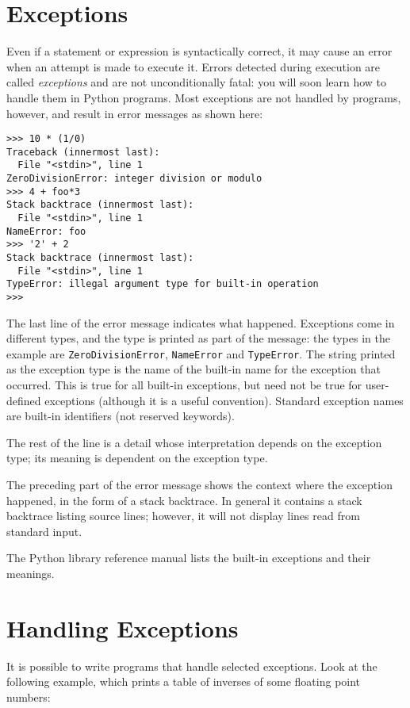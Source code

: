 \section{Exceptions}

Even if a statement or expression is syntactically correct, it may
cause an error when an attempt is made to execute it.
Errors detected during execution are called {\em exceptions} and are
not unconditionally fatal: you will soon learn how to handle them in
Python programs.  Most exceptions are not handled by programs,
however, and result in error messages as shown here:

\bcode\small\begin{verbatim}
>>> 10 * (1/0)
Traceback (innermost last):
  File "<stdin>", line 1
ZeroDivisionError: integer division or modulo
>>> 4 + foo*3
Stack backtrace (innermost last):
  File "<stdin>", line 1
NameError: foo
>>> '2' + 2
Stack backtrace (innermost last):
  File "<stdin>", line 1
TypeError: illegal argument type for built-in operation
>>> 
\end{verbatim}\ecode
%
The last line of the error message indicates what happened.
Exceptions come in different types, and the type is printed as part of
the message: the types in the example are
{\tt ZeroDivisionError},
{\tt NameError}
and
{\tt TypeError}.
The string printed as the exception type is the name of the built-in
name for the exception that occurred.  This is true for all built-in
exceptions, but need not be true for user-defined exceptions (although
it is a useful convention).
Standard exception names are built-in identifiers (not reserved
keywords).

The rest of the line is a detail whose interpretation depends on the
exception type; its meaning is dependent on the exception type.

The preceding part of the error message shows the context where the
exception happened, in the form of a stack backtrace.
In general it contains a stack backtrace listing source lines; however,
it will not display lines read from standard input.

The Python library reference manual lists the built-in exceptions and
their meanings.

\section{Handling Exceptions}

It is possible to write programs that handle selected exceptions.
Look at the following example, which prints a table of inverses of
some floating point numbers:

